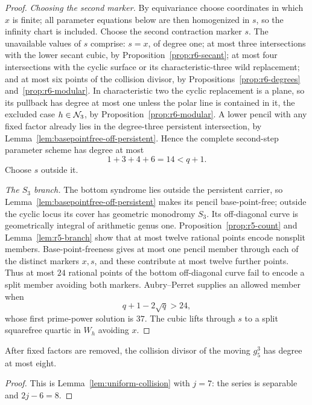 \begin{proof}
\emph{Choosing the second marker.}
By equivariance choose coordinates in which \(x\) is finite; all
parameter equations below are then homogenized in \(s\), so the
infinity chart is included.
Choose the second contraction marker \(s\).  The unavailable values of
\(s\) comprise: \(s=x\), of degree one; at most three intersections
with the lower secant cubic, by
Proposition~\ref{prop:r6-secant}; at most four intersections with the
cyclic surface or its characteristic-three wild replacement; and at
most six points of the collision divisor, by
Propositions~\ref{prop:r6-degrees} and~\ref{prop:r6-modular}.  In
characteristic two the cyclic
replacement is a plane, so its pullback has degree at most one unless
the polar line is contained in it, the excluded case
\(h\in\mathcal N_3\), by Proposition~\ref{prop:r6-modular}.  A lower pencil with
any fixed factor already lies in the degree-three persistent intersection, by
Lemma~\ref{lem:basepointfree-off-persistent}.  Hence
the complete second-step parameter
scheme has degree at most
\[
                         1+3+4+6=14<q+1.
\]
Choose \(s\) outside it.

\emph{The \(S_3\) branch.}
The bottom syndrome lies outside the persistent carrier, so
Lemma~\ref{lem:basepointfree-off-persistent} makes its pencil base-point-free;
outside the cyclic locus its cover has geometric monodromy \(S_3\).  Its
off-diagonal curve is geometrically integral of arithmetic genus one.
Proposition~\ref{prop:r5-count} and Lemma~\ref{lem:r5-branch} show that at most
twelve rational points encode nonsplit members.  Base-point-freeness gives at
most one pencil member through each of the distinct markers \(x,s\), and these
contribute at most twelve further points.  Thus at most \(24\) rational points
of the bottom off-diagonal curve fail to encode a split member avoiding both
markers.  Aubry--Perret supplies an allowed member when
\[
 q+1-2\sqrt q>24,
\]
whose first prime-power solution is \(37\).  The cubic
lifts through \(s\) to a split squarefree quartic in \(W_h\) avoiding
\(x\).
\end{proof}

\begin{proposition}\label{prop:r7-collision}%
%
After fixed factors are removed, the collision divisor of the
moving $g^3_5$ has degree at most eight.
\end{proposition}

\begin{proof}
This is Lemma~\ref{lem:uniform-collision} with \(j=7\):
the series is separable and \(2j-6=8\).
\end{proof}

